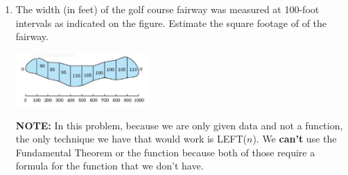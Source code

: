 \begin{enumerate}[1.]
\begin{Solution} 
Code that does this would be e.g.
\begin{verbatim}
f = @(x) x.^3 - 5; % note: our function has to work with _vectors_ of x values
% so we need to use '.^' instead of just '^' for the exponent/power
I = integral(f, 0, 5);
format long;   % have MATLAB print out more digits
I
\end{verbatim}
The results are
\begin{enumerate}
\item function: \verb#f = @(x) x.^3 - 5;# \\
estimated integral: 131.25000000
\item function: \verb#f = @(x) 4*log10(x);# \\
estimated integral: 24.36539860
\item function: \verb#f = @(x) (1/sqrt(2*pi)) * exp(-x.^2/2);# \\
estimate integral: 0.95449979
\end{enumerate}
Note that all these values are within $10^{-7}$ of the exact values
(except the last, which we only know to $10^{-5}$).
\end{Solution}

\item 
  \begin{Question}
    The width (in feet) of the golf course fairway was measured at
    100-foot intervals as indicated on the figure.  Estimate the square
    footage of of the fairway.  
    
    \begin{center}
      \includegraphics[width=2in]{graphics/Week06_IntegrationApplications/GolfHole}
    \end{center}
  \end{Question}
  
  
\begin{Solution}
  {\bf NOTE: } In this problem, because we are only given data and not
  a function, the only technique we have that would work is LEFT($n$).
  We {\bf can't} use the Fundamental Theorem or the \verb@integral@
  function because both of those require a formula for the function
  that we don't have.
\end{Solution}



\end{enumerate}
